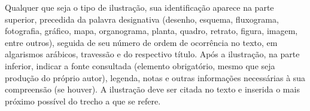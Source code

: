 \begin{citacao}
Qualquer que seja o tipo de ilustração, sua identificação aparece na parte
superior, precedida da palavra designativa (desenho, esquema, fluxograma,
fotografia, gráfico, mapa, organograma, planta, quadro, retrato, figura,
imagem, entre outros), seguida de seu número de ordem de ocorrência no texto,
em algarismos arábicos, travessão e do respectivo título. Após a ilustração, na
parte inferior, indicar a fonte consultada (elemento obrigatório, mesmo que
seja produção do próprio autor), legenda, notas e outras informações
necessárias à sua compreensão (se houver). A ilustração deve ser citada no
texto e inserida o mais próximo possível do trecho a que se
refere. \cite[seções 5.8]{NBR14724:2011}
\end{citacao}



